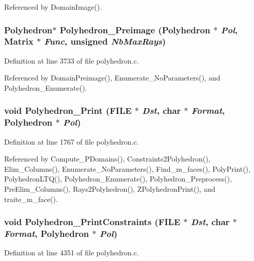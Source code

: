 Referenced by Domain\-Image().

\subsubsection{\setlength{\rightskip}{0pt plus 5cm}Polyhedron$\ast$ Polyhedron\_\-Preimage (Polyhedron $\ast$ {\em Pol}, Matrix $\ast$ {\em Func}, unsigned {\em Nb\-Max\-Rays})}\label{polyhedron_8c_a50}




Definition at line 3733 of file polyhedron.c.

Referenced by Domain\-Preimage(), Enumerate\_\-No\-Parameters(), and Polyhedron\_\-Enumerate().

\subsubsection{\setlength{\rightskip}{0pt plus 5cm}void Polyhedron\_\-Print (FILE $\ast$ {\em Dst}, char $\ast$ {\em Format}, Polyhedron $\ast$ {\em Pol})}\label{polyhedron_8c_a20}




Definition at line 1767 of file polyhedron.c.

Referenced by Compute\_\-PDomains(), Constraints2Polyhedron(), Elim\_\-Columns(), Enumerate\_\-No\-Parameters(), Find\_\-m\_\-faces(), Poly\-Print(), Polyhedron\-LTQ(), Polyhedron\_\-Enumerate(), Polyhedron\_\-Preprocess(), Pre\-Elim\_\-Columns(), Rays2Polyhedron(), ZPolyhedron\-Print(), and traite\_\-m\_\-face().

\subsubsection{\setlength{\rightskip}{0pt plus 5cm}void Polyhedron\_\-Print\-Constraints (FILE $\ast$ {\em Dst}, char $\ast$ {\em Format}, Polyhedron $\ast$ {\em Pol})}\label{polyhedron_8c_a57}




Definition at line 4351 of file polyhedron.c.

